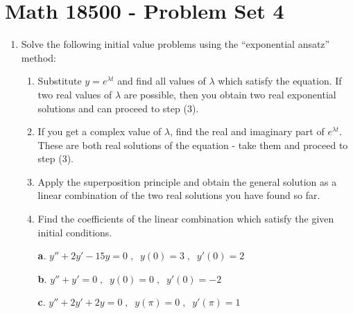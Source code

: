 \documentclass[10pt,psamsfonts,reqno,oneside,letterpaper]{amsart}
\begin{document}
	
	
	\section*{Math 18500 - Problem Set 4}
	\begin{enumerate}[I]
\item Solve the following initial value problems using the ``exponential ansatz'' method:
	\begin{enumerate}
		\item Substitute $y = e^{\lambda t}$ and find all values of $\lambda$ which satisfy the equation.  If two real values of $\lambda$ are possible, then you obtain two real exponential solutions and can proceed to step (3).  
		\item If you get a complex value of $\lambda$, find the real and imaginary part of $e^{\lambda t}$.  These are both real solutions of the equation - take them and proceed to step (3). 
		\item Apply the superposition principle and obtain the general solution as a linear combination of the two real solutions you have found so far.
		\item Find the coefficients of the linear combination which satisfy the given initial conditions.
	\end{enumerate}
	\begin{enumerate}
		\item[\textbf{a}.] $y'' + 2y' - 15 y = 0 \;, \; \; y(0) = 3 \; ,  \; \; y'(0) = 2 $
		\item[\textbf{b}.] $y'' + y' = 0 \; , \; \; y(0) = 0 \; , \; \; y'(0) = -2$
		\item[\textbf{c}.] $y'' + 2y' + 2y = 0 \; , \; \; y(\pi) = 0 \; , \; \; y'(\pi) = 1$
	\end{enumerate}
	

\end{enumerate}
\end{document}
